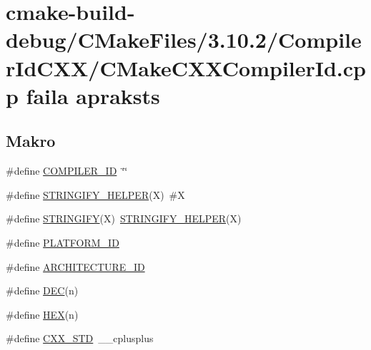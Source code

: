 \hypertarget{cmake-build-debug_2_c_make_files_23_810_82_2_compiler_id_c_x_x_2_c_make_c_x_x_compiler_id_8cpp}{}\section{cmake-\/build-\/debug/\+C\+Make\+Files/3.10.2/\+Compiler\+Id\+C\+X\+X/\+C\+Make\+C\+X\+X\+Compiler\+Id.cpp faila apraksts}
\label{cmake-build-debug_2_c_make_files_23_810_82_2_compiler_id_c_x_x_2_c_make_c_x_x_compiler_id_8cpp}
\subsection*{Makro}
\begin{DoxyCompactItemize}
\item 
\#define \hyperlink{cmake-build-debug_2_c_make_files_23_810_82_2_compiler_id_c_x_x_2_c_make_c_x_x_compiler_id_8cpp_a81dee0709ded976b2e0319239f72d174}{C\+O\+M\+P\+I\+L\+E\+R\+\_\+\+ID}~\char`\"{}\char`\"{}
\item 
\#define \hyperlink{cmake-build-debug_2_c_make_files_23_810_82_2_compiler_id_c_x_x_2_c_make_c_x_x_compiler_id_8cpp_a2ae9b72bb13abaabfcf2ee0ba7d3fa1d}{S\+T\+R\+I\+N\+G\+I\+F\+Y\+\_\+\+H\+E\+L\+P\+ER}(X)~\#X
\item 
\#define \hyperlink{cmake-build-debug_2_c_make_files_23_810_82_2_compiler_id_c_x_x_2_c_make_c_x_x_compiler_id_8cpp_a43e1cad902b6477bec893cb6430bd6c8}{S\+T\+R\+I\+N\+G\+I\+FY}(X)~\hyperlink{cmake-build-release_2_c_make_files_23_810_82_2_compiler_id_c_x_x_2_c_make_c_x_x_compiler_id_8cpp_a2ae9b72bb13abaabfcf2ee0ba7d3fa1d}{S\+T\+R\+I\+N\+G\+I\+F\+Y\+\_\+\+H\+E\+L\+P\+ER}(X)
\item 
\#define \hyperlink{cmake-build-debug_2_c_make_files_23_810_82_2_compiler_id_c_x_x_2_c_make_c_x_x_compiler_id_8cpp_adbc5372f40838899018fadbc89bd588b}{P\+L\+A\+T\+F\+O\+R\+M\+\_\+\+ID}
\item 
\#define \hyperlink{cmake-build-debug_2_c_make_files_23_810_82_2_compiler_id_c_x_x_2_c_make_c_x_x_compiler_id_8cpp_aba35d0d200deaeb06aee95ca297acb28}{A\+R\+C\+H\+I\+T\+E\+C\+T\+U\+R\+E\+\_\+\+ID}
\item 
\#define \hyperlink{cmake-build-debug_2_c_make_files_23_810_82_2_compiler_id_c_x_x_2_c_make_c_x_x_compiler_id_8cpp_ad1280362da42492bbc11aa78cbf776ad}{D\+EC}(n)
\item 
\#define \hyperlink{cmake-build-debug_2_c_make_files_23_810_82_2_compiler_id_c_x_x_2_c_make_c_x_x_compiler_id_8cpp_a46d5d95daa1bef867bd0179594310ed5}{H\+EX}(n)
\item 
\#define \hyperlink{cmake-build-debug_2_c_make_files_23_810_82_2_compiler_id_c_x_x_2_c_make_c_x_x_compiler_id_8cpp_a34cc889e576a1ae6c84ae9e0a851ba21}{C\+X\+X\+\_\+\+S\+TD}~\+\_\+\+\_\+cplusplus
\end{DoxyCompactItemize}
